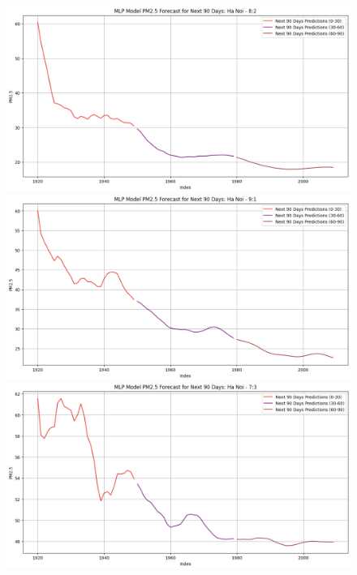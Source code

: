 \begin{figure}[H]
    \begin{minipage}{0.15\textwidth}
    \centering
    \includegraphics[width=1\textwidth]{img/final/MLP/90D/MLP_8_2_HN_90D.png}
    \end{minipage}
    \hfill
    \begin{minipage}{0.15\textwidth}
    \centering
    \includegraphics[width=1\textwidth]{img/final/MLP/90D/MLP_9_1_HN_90D.png}
    \end{minipage}
    \hfill
    \begin{minipage}{0.15\textwidth}
    \centering
    \includegraphics[width=1\textwidth]{img/final/MLP/90D/MLP_7_3_HN_90D.png}
    \end{minipage}
    \hfill


\end{figure}
